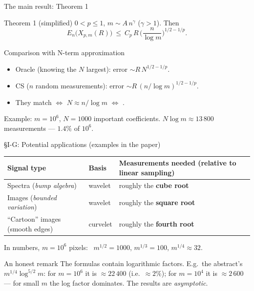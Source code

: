 \documentclass[aspectratio=169,11pt]{beamer}
\newcommand{\en}[1]{\textit{#1}}          %
\begin{document}
\begin{frame}{The main result: Theorem 1}
  \begin{block}{Theorem 1 (simplified)}
    $0<p\le1$, $m\sim A\,n^\gamma$ ($\gamma>1$). Then
    \[ E_n\big(X_{p,m}(R)\big)\ \le\ C_p\,R\,\Big(\frac{n}{\log m}\Big)^{1/2-1/p}. \]
  \end{block}
  \begin{exampleblock}{Comparison with N-term approximation}
    \begin{itemize}
      \item Oracle (knowing the $N$ largest): error $\sim R\,N^{1/2-1/p}$.
      \item CS ($n$ random measurements): error $\sim R\,(n/\log m)^{1/2-1/p}$.
      \item They match $\iff$ $N\approx n/\log m$ $\iff$ .
    \end{itemize}
  \end{exampleblock}
  {\small Example: $m=10^6$, $N=1000$ important coefficients. $N\log m\approx13\,800$ measurements --- $1.4\%$ of $10^6$.}
\end{frame}

\begin{frame}{\S I-G: Potential applications (examples in the paper)}
  \small
  \begin{tabular}{@{}p{3.6cm}p{4.6cm}p{5.2cm}@{}}
    \toprule
    \textbf{Signal type} & \textbf{Basis} & \textbf{Measurements needed (relative to linear sampling)} \\
    \midrule
    Spectra (\en{bump algebra}) & wavelet & roughly the \textbf{cube root} \\
    Images (\en{bounded variation}) & wavelet & roughly the \textbf{square root} \\
    ``Cartoon'' images (smooth edges) & curvelet & roughly the \textbf{fourth root} \\
    \bottomrule
  \end{tabular}
  \normalsize
  \smallskip

  In numbers, $m=10^6$ pixels: \ $m^{1/2}=1000$, \quad $m^{1/3}=100$, \quad $m^{1/4}\approx32$.
  \begin{alertblock}{An honest remark}
    The formulas contain logarithmic factors. E.g.\ the abstract's $m^{1/4}\log^{5/2}m$: for $m=10^6$ it is $\approx22\,400$ (i.e.\ $\approx2\%$);
    for $m=10^4$ it is $\approx2\,600$ --- for small $m$ the log factor dominates. The results are \emph{asymptotic}.
  \end{alertblock}
\end{frame}
\end{document}
